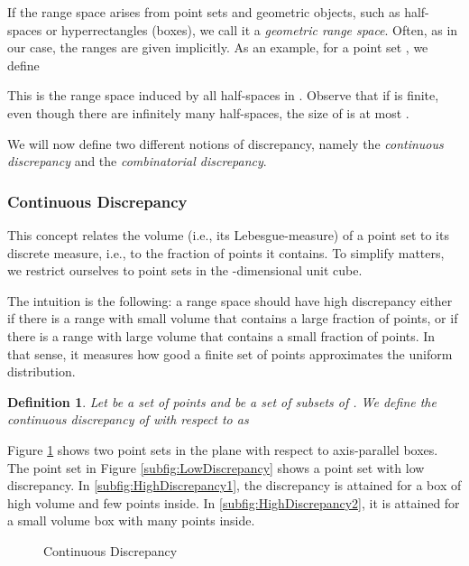 \documentclass[12pt]{article}
\newtheorem{definition}{Definition}
\begin{document}
If the range space arises from point sets and geometric objects, such as half-spaces or hyperrectangles (boxes), we call it a \emph{geometric range space}. Often, as in our case, the ranges are given implicitly. As an example, for a point set , we define 

This is the range space induced by all half-spaces in . Observe that if  is finite, even though there are infinitely many half-spaces, the size of  is at most .

We will now define two different notions of discrepancy, namely the \emph{continuous discrepancy} and the \emph{combinatorial discrepancy}.

\subsubsection{Continuous Discrepancy}
This concept relates the volume (i.e., its Lebesgue-measure) of a point set to its discrete measure, i.e., to the fraction of points it contains. To simplify matters, we restrict ourselves to point sets in the -dimensional unit cube. 

The intuition is the following: a range space should have high discrepancy either if there is a range with small volume that contains a large fraction of points, or if there is a range with large volume that contains a small fraction of points. In that sense, it measures how good a finite set of points approximates the uniform distribution.

\begin{definition}\label{Definition:ContinuousDiscrepancy}
Let  be a set of points and  be a set of subsets of . We define the \emph{continuous discrepancy} of  with respect to  as

\end{definition}
Figure \ref{fig:ContinuousDiscrepancy} shows two point sets in the plane with respect to axis-parallel boxes. The point set in Figure \ref{subfig:LowDiscrepancy} shows a point set with low discrepancy. In \ref{subfig:HighDiscrepancy1}, the discrepancy is attained for a box of high volume and few points inside. In \ref{subfig:HighDiscrepancy2}, it is attained for a small volume box with many points inside.
\begin{figure}
	\hfill
	\hfill
	\caption{Continuous Discrepancy}\label{fig:ContinuousDiscrepancy}
\end{figure}
\end{document}
